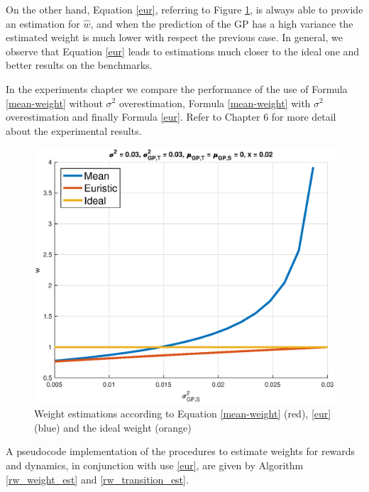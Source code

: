     \noindent On the other hand, Equation \ref{eur}, referring to Figure \ref{weight-plot}, is always
    able to provide an estimation for $\hat{w}$, and when the prediction of the GP has a high variance the estimated
    weight is much lower with respect the previous case. In general, we observe that Equation \ref{eur} leads
    to estimations much closer to the ideal one and better results on the benchmarks.\newline

    \noindent In the experiments chapter we compare the performance of the use of Formula \ref{mean-weight} without
    $\sigma^{2}$ overestimation, Formula \ref{mean-weight} with $\sigma^{2}$ overestimation and finally Formula \ref{eur}.
    Refer to Chapter 6 for more detail about the experimental results.\newline

    \begin{figure}
      \centering
      \includegraphics[scale=0.7]{images/weights-plot.eps}
      \caption{Weight estimations according to Equation \ref{mean-weight} (red), \ref{eur} (blue) and the ideal weight (orange)}
      \label{weight-plot}
    \end{figure}

    \noindent A pseudocode implementation of the procedures to estimate weights for rewards and dynamics, in conjunction with
    use \ref{eur}, are given by
    Algorithm \ref{rw_weight_est} and \ref{rw_transition_est}.

